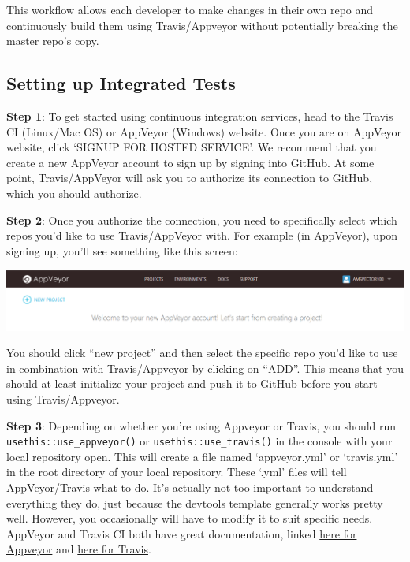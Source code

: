 \documentclass[
]{book}
\begin{document}
This workflow allows each developer to make changes in their own repo and continuously build them using Travis/Appveyor without potentially breaking the master repo's copy.

\hypertarget{setting-up-integrated-tests}{%
\subsection{Setting up Integrated Tests}\label{setting-up-integrated-tests}}

\textbf{Step 1}: To get started using continuous integration services, head to the Travis CI (Linux/Mac OS) or AppVeyor (Windows) website. Once you are on AppVeyor website, click `SIGNUP FOR HOSTED SERVICE'. We recommend that you create a new AppVeyor account to sign up by signing into GitHub. At some point, Travis/AppVeyor will ask you to authorize its connection to GitHub, which you should authorize.

\textbf{Step 2}: Once you authorize the connection, you need to specifically select which repos you'd like to use Travis/AppVeyor with. For example (in AppVeyor), upon signing up, you'll see something like this screen:

\includegraphics{images/testSS/appveyor1.PNG}

You should click ``new project'' and then select the specific repo you'd like to use in combination with Travis/Appveyor by clicking on ``ADD''. This means that you should at least initialize your project and push it to GitHub before you start using Travis/Appveyor.

\textbf{Step 3}: Depending on whether you're using Appveyor or Travis, you should run \texttt{usethis::use\_appveyor()} or \texttt{usethis::use\_travis()} in the console with your local repository open. This will create a file named `appveyor.yml' or `travis.yml' in the root directory of your local repository. These `.yml' files will tell AppVeyor/Travis what to do. It's actually not too important to understand everything they do, just because the devtools template generally works pretty well. However, you occasionally will have to modify it to suit specific needs. AppVeyor and Travis CI both have great documentation, linked \href{https://www.appveyor.com/docs/build-configuration/}{here for Appveyor} and \href{https://docs.travis-ci.com/user/languages/r/}{here for Travis}.
\end{document}
